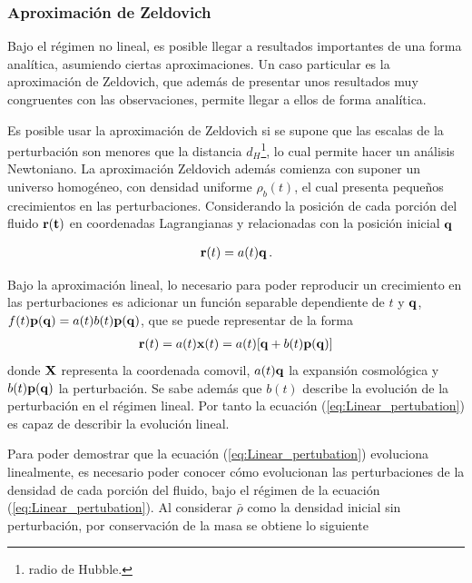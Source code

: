 

	\subsubsection{Aproximación de Zeldovich}
	\label{subsubsec:Zeldovich_Aproximation}

Bajo el régimen no lineal, es posible llegar a resultados importantes de una forma analítica, asumiendo ciertas aproximaciones. Un caso particular es la aproximación de Zeldovich, que además de presentar unos resultados muy congruentes con las observaciones, permite llegar a ellos de forma analítica. 

Es posible usar la aproximación de Zeldovich si se supone que las escalas de la perturbación son menores que la distancia $d_{H}$\footnote{radio de Hubble.}, lo cual permite hacer un análisis Newtoniano. La aproximación Zeldovich además comienza con suponer un universo homogéneo, con densidad uniforme $\rho_{b}(t)$, el  cual presenta pequeños crecimientos en las perturbaciones. Considerando la posición de cada porción del fluido $\bf{r}(t)$ en coordenadas Lagrangianas y relacionadas con la posición inicial $\bf{q}$

\begin{align}
{\bf{r}}(t)=a(t){\bf{q}}\,.
\end{align}

Bajo la aproximación lineal, lo necesario para poder reproducir un crecimiento en las perturbaciones es adicionar un función separable dependiente de $t$ y $\bf{q}$, $f(t){\bf{p}}({\bf{q}})=a(t)b(t){\bf{p}(\bf{q})}$, que se puede representar de la forma 
%
\begin{align}
{\bf{r}}(t)=a(t){\bf{x}}(t)=a(t)[{\bf{q}}+b(t){\bf{p(q)}}]
\label{eq:Linear_pertubation}
\end{align}
%
donde ${\bf{X}}$ representa la coordenada comovil, $a(t){\bf{q}}$  la expansión cosmológica y $b(t){\bf{p(q)}}$ la perturbación. Se sabe además que $b(t)$ describe la evolución de la perturbación en el régimen lineal. Por tanto la ecuación (\ref{eq:Linear_pertubation}) es capaz de describir la evolución lineal.

Para poder demostrar que la ecuación (\ref{eq:Linear_pertubation})  evoluciona linealmente, es necesario poder conocer cómo evolucionan las perturbaciones de la densidad de cada porción del fluido, bajo el régimen de la ecuación (\ref{eq:Linear_pertubation}). Al considerar $\bar{\rho}$ como la densidad inicial sin perturbación, por conservación de la masa se obtiene lo siguiente

